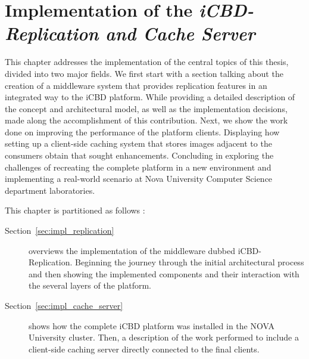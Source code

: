 \chapter{Implementation of the \textit{iCBD-Replication and Cache Server}}
\label{cha:impl_replication_caching}

This chapter addresses the implementation of the central topics of this thesis, divided into two major fields.
We first start with a section talking about the creation of a middleware system that provides replication features in an integrated way to the iCBD platform. While providing a detailed description of the concept and architectural model, as well as the implementation decisions, made along the accomplishment of this contribution.
Next, we show the work done on improving the performance of the platform clients. Displaying how setting up a client-side caching system that stores images adjacent to the consumers obtain that sought enhancements. Concluding in exploring the challenges of recreating the complete platform in a new environment and implementing a real-world scenario at Nova University Computer Science department laboratories.


This chapter is partitioned as follows :

\begin{description}
    \item [Section~\ref{sec:impl_replication}] overviews the implementation of the middleware dubbed iCBD-Replication. Beginning the journey through the initial architectural process and then showing the implemented components and their interaction with the several layers of the platform.
    \item [Section~\ref{sec:impl_cache_server}] shows how the complete iCBD platform was installed in the NOVA University cluster. Then, a description of the work performed to include a client-side caching server directly connected to the final clients.
\end{description}
\newpage


